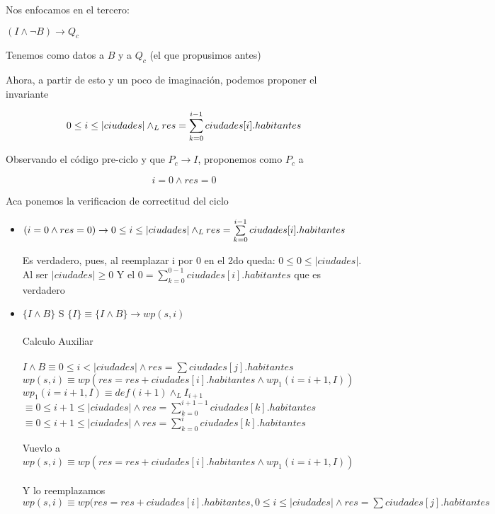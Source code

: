 \documentclass[10pt,a4paper]{article}
\begin{document}
\begin {enumerate}
    Nos enfocamos en el tercero:

    $ (I \land \neg B) \rightarrow Q_{c} $

    Tenemos como datos a $B$ y a $Q_{c}$ (el que propusimos antes)

    Ahora, a partir de esto y un poco de imaginación, podemos proponer el invariante

    $$ 0 \leq i \leq |ciudades| \land _L res = \sum\limits_{k=0}^{i - 1}{ciudades[i].habitantes}$$

    Observando el código pre-ciclo y que $P_{c} \rightarrow I $, proponemos como $P_{c}$ a

    $$i=0 \land res = 0$$

    Aca ponemos la verificacion de correctitud del ciclo

    \begin{itemize}
        \item $(i = 0 \land res = 0) \rightarrow 0 \leq i \leq |ciudades| \land _L res = \sum\limits_{k=0}^{i - 1}{ciudades[i].habitantes}$
        
        Es verdadero, pues, al reemplazar i por 0 en el 2do queda: $0 \leq 0 \leq |ciudades|$. Al ser $|ciudades| \geq 0$
        Y el $0 = \sum\limits_{k=0}^{0 - 1}{ciudades[i].habitantes}$ que es verdadero

        \item $\{I \land B\}$  S $\{I\} \equiv \{I \land B\} \rightarrow wp(s,i)$
        \\
        \\
        Calculo Auxiliar \\ 
        \\
         ${I \land B } \equiv {0 \leq i < |ciudades|\land res=\sum ciudades[j].habitantes}$ \\
         $wp(s,i)\equiv wp(res=res+ciudades[i].habitantes \land wp_{1}(i=i+1,I))$ \\
         $wp_{1}(i=i+1,I) \equiv def(i+1) \land_{L}I_{i+1}  $ \\
         $\equiv 0 \leq i + 1 \leq |ciudades| \land res = \sum\limits_{k=0}^{i + 1 - 1}{ciudades[k].habitantes} $ \\
         $ \equiv 0 \leq i + 1 \leq |ciudades|  \land res = \sum\limits_{k=0}^{i}{ciudades[k].habitantes}$ 

         Vuevlo a \\
         $ wp(s,i)\equiv wp(res=res+ciudades[i].habitantes \land wp_{1}(i=i+1,I))$
         \\
         \\ 
         Y lo reemplazamos \\
         $ wp(s,i)\equiv wp(res=res+ciudades[i].habitantes, 0 \leq i \leq |ciudades|\land res=\sum ciudades[j].habitantes$ \\


\end{itemize}
\end{enumerate}
\end{document}
